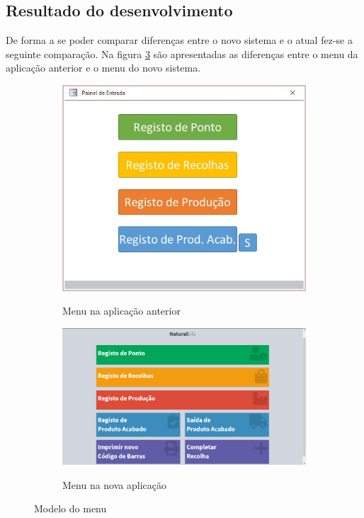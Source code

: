 \subsection{Resultado do desenvolvimento}
De forma a se poder comparar diferenças entre o novo sistema e o atual fez-se a seguinte comparação.
Na figura \ref{fig:comparacao_menu} são apresentadas as diferenças entre o menu da aplicação anterior e o menu do novo sistema.
\begin{figure}[H]
	\centering
	
	\begin{subfigure}[t]{0.35\linewidth}
		\includegraphics[width=\linewidth]{figuras/AppAccess/0-MenuInicial.jpg}
		\label{fig:comparacao_menu_1}
		\caption{Menu na aplicação anterior}
	\end{subfigure}
	\begin{subfigure}[t]{0.55\linewidth}
		\includegraphics[width=\linewidth]{figuras/AppPhp/0-menu_2_fase.png}
		\label{fig:comparacao_menu_2}
		\caption{Menu na nova aplicação}
	\end{subfigure}
	
	\caption{Modelo do menu}
	\label{fig:comparacao_menu}
\end{figure}
